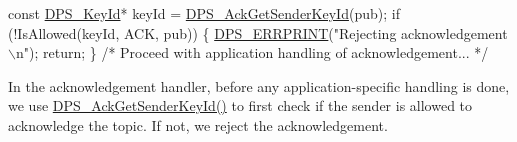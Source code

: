 \begin{DoxyCodeInclude}
    \textcolor{keyword}{const} \hyperlink{struct___d_p_s___key_id}{DPS\_KeyId}* keyId = \hyperlink{group__publication_ga9190b8fa3bad848fb428acd6c0c2b210}{DPS\_AckGetSenderKeyId}(pub);
    \textcolor{keywordflow}{if} (!IsAllowed(keyId, ACK, pub)) \{
        \hyperlink{group__debug_gac69225c4b8e73b27204a2963d4ca0633}{DPS\_ERRPRINT}(\textcolor{stringliteral}{"Rejecting acknowledgement\(\backslash\)n"});
        \textcolor{keywordflow}{return};
    \}
    \textcolor{comment}{/* Proceed with application handling of acknowledgement... */}
\end{DoxyCodeInclude}
In the acknowledgement handler, before any application-\/specific handling is done, we use \hyperlink{group__publication_ga9190b8fa3bad848fb428acd6c0c2b210}{D\+P\+S\+\_\+\+Ack\+Get\+Sender\+Key\+Id()} to first check if the sender is allowed to acknowledge the topic. If not, we reject the acknowledgement. 